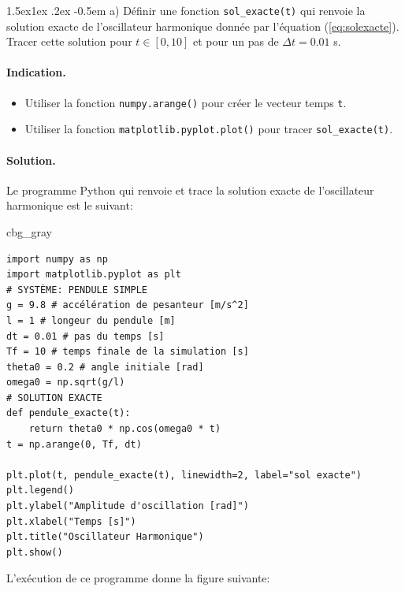 \documentclass[%
oneside,                 %
final,                   %
10pt,french]{article}
\makeatletter
\newenvironment{_cod_tight}[1]{
   \def\FrameCommand{\colorbox{#1}}
   \FrameRule0.6pt\MakeFramed {\FrameRestore}\vskip3mm}
   {\vskip0mm\endMakeFramed}
\newenvironment{cod}[1]{
\bgroup\rmfamily
\fboxsep=0mm\relax
\begin{_cod_tight}{#1}
\list{}{\parsep=-2mm\parskip=0mm\topsep=0pt\leftmargin=2mm
\rightmargin=2\leftmargin\leftmargin=4pt\relax}
\item\relax}
{\endlist\end{_cod_tight}\egroup}
\newenvironment{doconceexercise}{}{}
\newcommand\subex{\@startsection{paragraph}{4}{\z@}%
                  {1.5ex\@plus1ex \@minus.2ex}%
                  {-0.5em}%
                  {\normalfont\normalsize\bfseries}}
\makeatother
\begin{document}
\begin{doconceexercise}
\subex{a)}
Définir une fonction \Verb!sol_exacte(t)! qui renvoie la solution exacte de l'oscillateur harmonique donnée par l'équation (\ref{eq:solexacte}). Tracer cette solution pour $t \in [0,10]$ et pour un pas de $\Delta t = 0.01$ s.


\paragraph{Indication.}
\begin{itemize}
\item Utiliser la fonction \texttt{numpy.arange()} pour créer le vecteur temps \texttt{t}.

\item Utiliser la fonction \texttt{matplotlib.pyplot.plot()} pour tracer \Verb!sol_exacte(t)!.
\end{itemize}

\noindent


\paragraph{Solution.}
Le programme Python qui renvoie et trace la solution exacte de l'oscillateur harmonique est le suivant:

\begin{cod}{cbg_gray}\begin{verbatim}
import numpy as np
import matplotlib.pyplot as plt
# SYSTÈME: PENDULE SIMPLE
g = 9.8 # accélération de pesanteur [m/s^2]
l = 1 # longeur du pendule [m]
dt = 0.01 # pas du temps [s]
Tf = 10 # temps finale de la simulation [s]
theta0 = 0.2 # angle initiale [rad]
omega0 = np.sqrt(g/l) 
# SOLUTION EXACTE
def pendule_exacte(t):
    return theta0 * np.cos(omega0 * t)
t = np.arange(0, Tf, dt)

plt.plot(t, pendule_exacte(t), linewidth=2, label="sol exacte")
plt.legend()
plt.ylabel("Amplitude d'oscillation [rad]")
plt.xlabel("Temps [s]")
plt.title("Oscillateur Harmonique")
plt.show()
\end{verbatim}
\end{cod}
\noindent

L'exécution de ce programme donne la figure suivante:



\vspace{6mm}


\end{doconceexercise}
\end{document}
